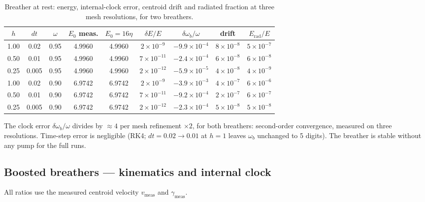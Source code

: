 \documentclass[11pt,a4paper]{article}
\theoremstyle{plain}
\theoremstyle{remark}
\begin{document}
\begin{table}[htbp]
\centering\small
\begin{tabular}{ccccccccc}
\toprule
$h$ & $dt$ & $\omega$ & $E_0$ meas. & $E_0 = 16\eta$ & $\delta E/E$ & $\delta\omega_b/\omega$ & drift & $E_{\text{rad}}/E$ \\
\midrule
1.00 & 0.02  & 0.95 & 4.9960 & 4.9960 & $2\times10^{-9}$  & $-9.9\times10^{-4}$ & $8\times10^{-8}$ & $5\times10^{-7}$ \\
0.50 & 0.01  & 0.95 & 4.9960 & 4.9960 & $7\times10^{-11}$ & $-2.4\times10^{-4}$ & $6\times10^{-8}$ & $6\times10^{-8}$ \\
0.25 & 0.005 & 0.95 & 4.9960 & 4.9960 & $2\times10^{-12}$ & $-5.9\times10^{-5}$ & $4\times10^{-8}$ & $4\times10^{-9}$ \\
1.00 & 0.02  & 0.90 & 6.9742 & 6.9742 & $2\times10^{-9}$  & $-3.9\times10^{-3}$ & $4\times10^{-7}$ & $6\times10^{-6}$ \\
0.50 & 0.01  & 0.90 & 6.9742 & 6.9742 & $7\times10^{-11}$ & $-9.2\times10^{-4}$ & $2\times10^{-7}$ & $6\times10^{-7}$ \\
0.25 & 0.005 & 0.90 & 6.9742 & 6.9742 & $2\times10^{-12}$ & $-2.3\times10^{-4}$ & $5\times10^{-8}$ & $5\times10^{-8}$ \\
\bottomrule
\end{tabular}
\caption{Breather at rest: energy, internal-clock error, centroid drift and radiated fraction at three mesh resolutions, for two breathers.}
\label{tab:breather_rest}
\end{table}

The clock error $\delta\omega_b/\omega$ divides by $\approx 4$ per mesh refinement $\times 2$, for both breathers: second-order convergence, measured on three resolutions. Time-step error is negligible (RK4; $dt = 0.02 \to 0.01$ at $h = 1$ leaves $\omega_b$ unchanged to 5 digits). The breather is stable without any pump for the full runs.

\subsection{Boosted breathers --- kinematics and internal clock}
All ratios use the measured centroid velocity $v_{\text{meas}}$ and $\gamma_{\text{meas}}$.
\end{document}
